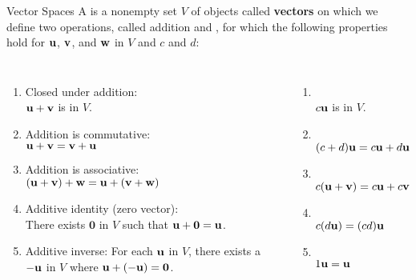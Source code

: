 \documentclass[xcolor=dvipsnames,aspectratio=169,t]{beamer}
\begin{document}
\begin{frame}{Vector Spaces}
  A  is a nonempty set $V$ of objects called \textbf{vectors} on which we define two operations, called \alert{addition} and , for which the following properties hold for  $\mathbf{u}$, $\mathbf{v}$, and $\mathbf{w}$ in $V$ and  $c$ and $d$:
  \medskip

  \begin{columns}[T]
  \column{0.5\tw}
  \begin{enumerate}
    \item \alert{Closed under addition:} \\ \quad $\mathbf{u} + \mathbf{v}$ is in $V$.
    \item \alert{Addition is commutative:} \\ \quad $\mathbf{u} + \mathbf{v} = \mathbf{v} + \mathbf{u}$
    \item \alert{Addition is associative:} \\ \quad $(\mathbf{u} + \mathbf{v}) + \mathbf{w} = \mathbf{u} + (\mathbf{v} + \mathbf{w})$
    \item \alert{Additive identity (zero vector):} \\ There exists $\mathbf{0}$ in $V$ such that $\mathbf{u} + \mathbf{0} = \mathbf{u}$.
    \item \alert{Additive inverse:} For each $\mathbf{u}$ in $V$, there exists a $- \mathbf{u}$ in $V$ where $\mathbf{u} + (- \mathbf{u}) = \mathbf{0}$.
  \end{enumerate}

  \column{0.5\tw}
  \begin{enumerate}
  \addtocounter{enumi}{5}
    \item {} \\ \quad $c \mathbf{u}$ is in $V$.
    \item {} \\ \quad $(c+d)  \mathbf{u} = c \mathbf{u} + d \mathbf{u}$
    \item {} \\ \quad $c( \mathbf{u} + \mathbf{v} ) = c \mathbf{u} + c \mathbf{v}$
    \item {} \\ \quad $c (d \mathbf{u}) = (cd) \mathbf{u}$
    \item {}  \\ \quad $1 \mathbf{u} = \mathbf{u}$
  \end{enumerate}
  \end{columns}
\end{frame}
\end{document}

